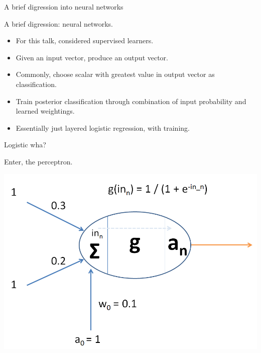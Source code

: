 \documentclass{beamer}
\begin{document}
\begin{frame}{A brief digression into neural networks}

  A brief digression: neural networks.

  \begin{itemize}
  \item For this talk, considered supervised learners.
  \item Given an input vector, produce an output vector.
  \item Commonly, choose scalar with greatest value in output vector as
    classification.
  \item Train posterior classification through combination of input
    probability and learned weightings.
  \item Essentially just layered logistic regression, with training.
  \end{itemize}

\end{frame}

\begin{frame}{Logistic wha?}

  Enter, the perceptron.

  \begin{center}
    \includegraphics[scale=0.4]{ptron}
  \end{center}

\end{frame}
\end{document}
